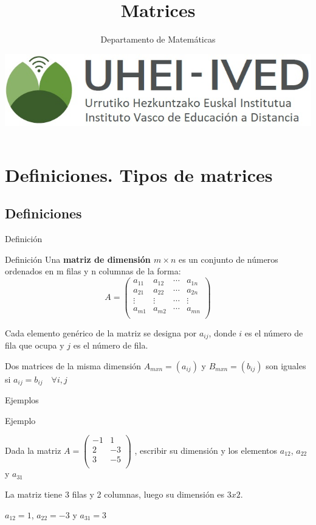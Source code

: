 \documentclass[9pt]{beamer}
\author{Departamento de Matemáticas}
\title{Matrices}
\date{\includegraphics[scale=0.15]{imagenes/logoa.jpg}}
\begin{document}
\begin{frame}
\titlepage
\end{frame}

\begin{frame}
\tableofcontents
\end{frame}

\section{Definiciones. Tipos de matrices}

\subsection{Definiciones}

\begin{frame}{Definición}
\begin{alertblock}{Definición}
Una {\bf matriz de dimensión $m \times n$}  es un conjunto de números ordenados en m filas y n columnas de la forma:
 \[ A=\begin{pmatrix} 
 a_{11} & a_{12} & \cdots & a_{1n} \\
 a_{21} & a_{22} & \cdots & a_{2n} \\
  \vdots  & \vdots  & \cdots & \vdots \\
 a_{m1} & a_{m2} & \cdots & a_{mn} \\
\end{pmatrix}
\]
\end{alertblock}
\pause

Cada elemento genérico de la matriz se designa por $a_{ij}$, donde $i$ es el número de fila que ocupa y $j$ es el número de fila.

\pause

Dos matrices de la misma dimensión $A_{mxn}=(a_{ij})$ y $B_{mxn}=(b_{ij})$ son iguales si $a_{ij}=b_{ij}\quad \forall i,j$
\end{frame}

\begin{frame}{Ejemplos}
\begin{exampleblock}{Ejemplo}

Dada la matriz
$A= \begin{pmatrix}  -1 & 1  \\  2 & -3 \\  3 & -5 \\ \end{pmatrix}$ , escribir su dimensión y los elementos $a_{12}$, $a_{22}$ y $a_{31}$

\end{exampleblock}

\pause

La matriz tiene 3 filas y  2 columnas, luego su dimensión es $3x2$.

\pause 

$a_{12} = 1$, $a_{22}= -3$ y $a_{31}=3$

\end{frame}
\end{document}
